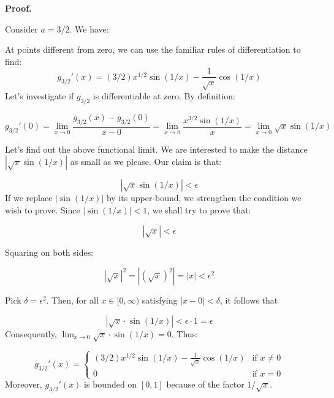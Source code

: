 \documentclass[10pt]{article}
\begin{document}
\textbf{Proof.}



Consider $\displaystyle a=3/2$. We have:



At points different from zero, we can use the familiar rules of differentiation to find:
\begin{equation*}
g_{3/2} '( x) =( 3/2) x^{1/2}\sin( 1/x) -\frac{1}{\sqrt{x}}\cos( 1/x)
\end{equation*}
Let's investigate if $\displaystyle g_{3/2}$ is differentiable at zero. By definition:


\begin{equation*}
g_{3/2} '( 0) =\lim _{x\rightarrow 0}\frac{g_{3/2}( x) -g_{3/2}( 0)}{x-0} =\lim _{x\rightarrow 0}\frac{x^{3/2}\sin( 1/x)}{x} =\lim _{x\rightarrow 0}\sqrt{x}\sin( 1/x)
\end{equation*}


Let's find out the above functional limit. We are interested to make the distance $\displaystyle |\sqrt{x}\sin( 1/x) |$ as small as we please. Our claim is that:


\begin{equation*}
|\sqrt{x}\sin( 1/x) |< \epsilon 
\end{equation*}
If we replace $\displaystyle |\sin( 1/x) |$ by its upper-bound, we strengthen the condition we wish to prove. Since $\displaystyle |\sin( 1/x) |< 1$, we shall try to prove that:


\begin{equation*}
|\sqrt{x} |< \epsilon 
\end{equation*}


Squaring on both sides:


\begin{equation*}
|\sqrt{x} |^{2} =|\left(\sqrt{x}\right)^{2} |=|x|< \epsilon ^{2}
\end{equation*}


Pick $\displaystyle \delta =\epsilon ^{2}$. Then, for all $\displaystyle x\in [ 0,\infty )$ satisfying $\displaystyle |x-0|< \delta $, it follows that 


\begin{equation*}
|\sqrt{x} \cdot \sin( 1/x) |< \epsilon \cdot 1=\epsilon 
\end{equation*}
Consequently, $\displaystyle \lim _{x\rightarrow 0}\sqrt{x} \cdot \sin( 1/x) =0$. Thus:


\begin{equation*}
g_{3/2} '( x) =\begin{cases}
( 3/2) x^{1/2}\sin( 1/x) -\frac{1}{\sqrt{x}}\cos( 1/x) & \text{if } x\neq 0\\
0 & \text{if } x=0
\end{cases}
\end{equation*}
Moreover, $\displaystyle g_{3/2} '( x)$ is bounded on $\displaystyle [ 0,1]$ because of the factor $\displaystyle 1/\sqrt{x}$. 
\end{document}
